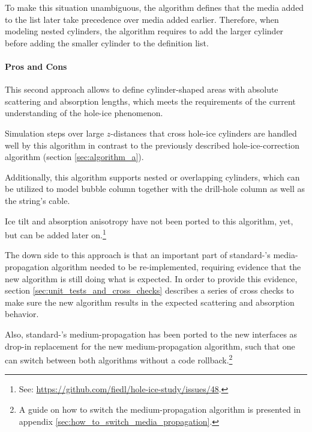 To make this situation unambiguous, the algorithm defines that the media added to the list later take precedence over media added earlier. Therefore, when modeling nested cylinders, the algorithm requires to add the larger cylinder before adding the smaller cylinder to the definition list.

\paragraph{Pros and Cons}
This second approach allows to define cylinder-shaped areas with absolute scattering and absorption lengths, which meets the requirements of the current understanding of the hole-ice phenomenon.

Simulation steps over large $z$-distances that cross hole-ice cylinders are handled well by this algorithm in contrast to the previously described hole-ice-correction algorithm (section \ref{sec:algorithm_a}).

Additionally, this algorithm supports nested or overlapping cylinders, which can be utilized to model bubble column together with the drill-hole column as well as the string's cable.

Ice tilt and absorption anisotropy have not been ported to this algorithm, yet, but can be added later on.\footnote{See: \url{https://github.com/fiedl/hole-ice-study/issues/48}.}

The down side to this approach is that an important part of standard-\clsim's media-propagation algorithm needed to be re-implemented, requiring evidence that the new algorithm is still doing what is expected. In order to provide this evidence, section \ref{sec:unit_tests_and_cross_checks} describes a series of cross checks to make sure the new algorithm results in the expected scattering and absorption behavior.

Also, standard-\clsim's medium-propagation has been ported to the new interfaces as drop-in replacement for the new medium-propagation algorithm, such that one can switch between both algorithms without a code rollback.\footnote{A guide on how to switch the medium-propagation algorithm is presented in appendix \ref{sec:how_to_switch_media_propagation}.}

